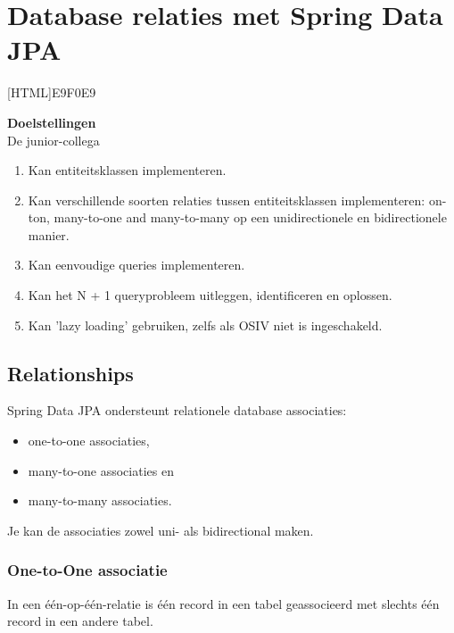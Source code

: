 \chapter{Database relaties met Spring Data JPA}


[HTML]{E9F0E9}{\parbox{\textwidth}{%
\noindent \textbf{Doelstellingen}\\
De junior-collega
\begin{enumerate}[nolistsep]
\item Kan entiteitsklassen implementeren.
\item Kan verschillende soorten relaties tussen entiteitsklassen implementeren: on-ton, many-to-one and many-to-many op een unidirectionele en bidirectionele manier.
\item Kan eenvoudige queries implementeren.
\item Kan het N + 1 queryprobleem uitleggen, identificeren en oplossen.
\item Kan 'lazy loading' gebruiken, zelfs als OSIV niet is ingeschakeld.
\end{enumerate}}}

\section{Relationships}

Spring Data JPA ondersteunt relationele database associaties:

\begin{itemize}
\item one-to-one associaties,
\item many-to-one associaties en
\item many-to-many associaties.
\end{itemize}
Je kan de associaties zowel uni- als bidirectional maken.


\subsection{One-to-One associatie}

In een één-op-één-relatie is één record in een tabel geassocieerd met slechts één record in een andere tabel.

